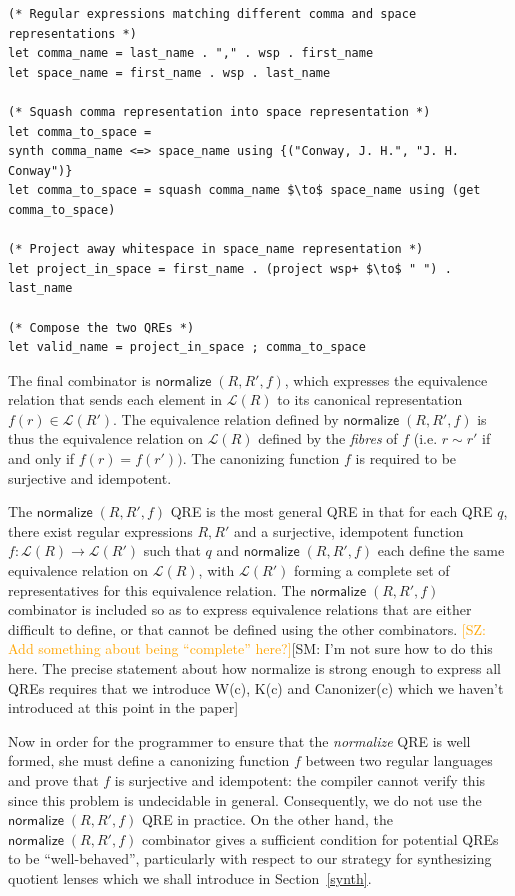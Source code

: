 \documentclass[acmsmall,review,anonymous]{acmart}\settopmatter{printfolios=true,printccs=false,printacmref=false}
\newcommand{\FINISH}[3]{\ifdraft\textcolor{#1}{[#2: #3]}\fi}
\newcommand{\saz}[1]{\FINISH{orange}{SZ}{#1}}
\newcommand{\sam}[1]{\FINISH{dkpurple}{SM}{#1}}
\newcommand{\kw}[1]{\ensuremath{\mathsf{#1}}}
\newcommand{\normalize}[3]{\ensuremath{\kw{normalize} \; (#1, #2, #3)}}
\begin{document}
\begin{lstlisting}
(* Regular expressions matching different comma and space representations *)
let comma_name = last_name . "," . wsp . first_name
let space_name = first_name . wsp . last_name

(* Squash comma representation into space representation *)
let comma_to_space =
synth comma_name <=> space_name using {("Conway, J. H.", "J. H. Conway")}
let comma_to_space = squash comma_name $\to$ space_name using (get comma_to_space)

(* Project away whitespace in space_name representation *)
let project_in_space = first_name . (project wsp+ $\to$ " ") . last_name

(* Compose the two QREs *)
let valid_name = project_in_space ; comma_to_space
\end{lstlisting}

The final combinator is $\normalize{R}{R'}{f}$, which expresses
the equivalence relation that sends each element in $\mathcal{L}(R)$ to its
canonical representation $f(r) \in \mathcal{L}(R')$. The equivalence relation
defined by $\normalize{R}{R'}{f}$ is thus the equivalence relation on
$\mathcal{L}(R)$ defined by the {\em fibres} of $f$ (i.e. $r \sim r'$ if and
only if $f(r) = f(r'))$. The canonizing function $f$ is required to be
surjective and idempotent.

The $\normalize{R}{R'}{f}$ QRE is the most general QRE in that for each QRE
$q$, there exist regular expressions $R, R'$ and a surjective, idempotent
function $f:\mathcal{L}(R) \longrightarrow \mathcal{L}(R')$ such that $q$ and
$\normalize{R}{R'}{f}$ each define the same equivalence relation on
$\mathcal{L}(R)$, with $\mathcal{L}(R')$ forming a complete set of
representatives for this equivalence relation. The $\normalize{R}{R'}{f}$
combinator is included so as to express equivalence relations that are either
difficult to define, or that cannot be defined using the other combinators.
\saz{Add something about being ``complete'' here?}\sam{I'm not sure how to do
this here. The precise statement about how normalize is strong enough to
express all QREs requires that we introduce W(c), K(c) and Canonizer(c) which
we haven't introduced at this point in the paper}

Now in order for the programmer to ensure that the {\em normalize} QRE is well
formed, she must define a canonizing function $f$ between two regular
languages and prove that $f$ is surjective and idempotent: the compiler cannot
verify this since this problem is undecidable in general. Consequently, we do
not use the $\normalize{R}{R'}{f}$ QRE in practice. On the other hand, the
$\normalize{R}{R'}{f}$ combinator gives a sufficient condition for potential
QREs to be ``well-behaved'', particularly with respect to our strategy for
synthesizing quotient lenses which we shall introduce in Section~\ref{synth}.
\end{document}
